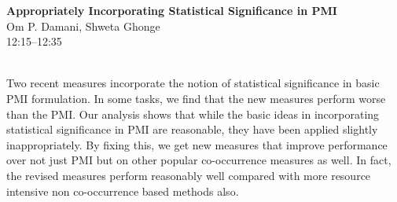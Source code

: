 \documentclass[twoside,makeidx]{book}
\begin{document}
\par\vspace{2em}\noindent%
\begin{minipage}{\linewidth}%
\begin{center}
\textbf{\normalsize Appropriately Incorporating Statistical Significance in PMI}\\
\normalsize  Om P. Damani,  Shweta Ghonge\\
{\small 12:15--12:35}\\
\end{center}
\end{minipage}\\[0.5em]
\nopagebreak%
\noindent%
{\small Two recent measures incorporate the notion of statistical significance in basic PMI formulation. In some tasks, we find that the new measures perform worse than the PMI. Our analysis shows that while the basic ideas in incorporating statistical significance in PMI are reasonable, they have been applied slightly inappropriately. By fixing this, we get new measures that improve performance over not just PMI but on other popular co-occurrence measures as well. In fact, the revised measures perform reasonably well compared with more resource intensive non co-occurrence based methods also.}
\clearpage
\end{document}
